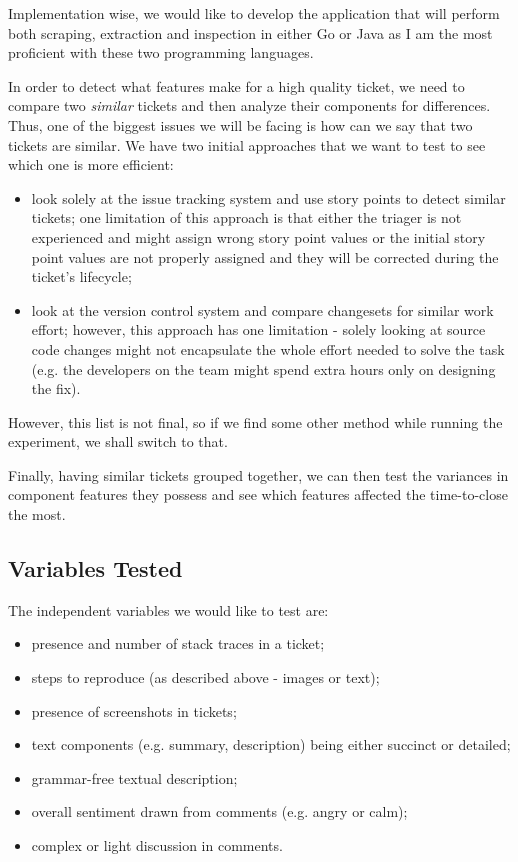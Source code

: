 \documentclass{mprop}
\begin{document}
Implementation wise, we would like to develop the application that will
perform both scraping, extraction and inspection in either Go or Java
as I am the most proficient with these two programming languages. 

In order to detect what features make for a high quality ticket, we need 
to compare two \emph{similar} tickets and then analyze their components
for differences. Thus, one of the biggest issues we will be facing is how 
can we say that two tickets are similar. We have two initial approaches
that we want to test to see which one is more efficient:
  \begin{itemize}
    \item look solely at the issue tracking system and use story points
      to detect similar tickets; one limitation of this approach is that
      either the triager is not experienced and might assign wrong story
      point values or the initial story point values are not properly
      assigned and they will be corrected during the ticket's lifecycle;
    \item look at the version control system and compare changesets for
      similar work effort; however, this approach has one limitation - 
      solely looking at source code changes might not encapsulate the
      whole effort needed to solve the task (e.g. the developers on the
      team might spend extra hours only on designing the fix).
  \end{itemize}
However, this list is not final, so if we find some other method 
while running the experiment, we shall switch to that.

Finally, having similar tickets grouped together, we can then test 
the variances in component features they possess and see which features
affected the time-to-close the most.

\subsection{Variables Tested}

The independent variables we would like to test are:
  \begin{itemize}
    \item presence and number of stack traces in a ticket;
    \item steps to reproduce (as described above - images or text);
    \item presence of screenshots in tickets;
    \item text components (e.g. summary, description) being either 
      succinct or detailed;
    \item grammar-free textual description;
    \item overall sentiment drawn from comments (e.g. angry or calm);
    \item complex or light discussion in comments.
  \end{itemize}
\end{document}
